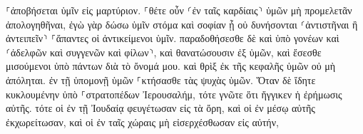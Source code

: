 \documentclass{openreader}
\begin{document}
⸀ἀποβήσεται ὑμῖν εἰς μαρτύριον. 
⸀θέτε οὖν ⸂ἐν ταῖς καρδίαις⸃ ὑμῶν μὴ προμελετᾶν ἀπολογηθῆναι, 
ἐγὼ γὰρ δώσω ὑμῖν στόμα καὶ σοφίαν ᾗ οὐ δυνήσονται ⸂ἀντιστῆναι ἢ ἀντειπεῖν⸃ ⸀ἅπαντες οἱ ἀντικείμενοι ὑμῖν. 
παραδοθήσεσθε δὲ καὶ ὑπὸ γονέων καὶ ⸂ἀδελφῶν καὶ συγγενῶν καὶ φίλων⸃, καὶ θανατώσουσιν ἐξ ὑμῶν, 
καὶ ἔσεσθε μισούμενοι ὑπὸ πάντων διὰ τὸ ὄνομά μου. 
καὶ θρὶξ ἐκ τῆς κεφαλῆς ὑμῶν οὐ μὴ ἀπόληται. 
ἐν τῇ ὑπομονῇ ὑμῶν ⸀κτήσασθε τὰς ψυχὰς ὑμῶν. 
Ὅταν δὲ ἴδητε κυκλουμένην ὑπὸ ⸀στρατοπέδων Ἰερουσαλήμ, τότε γνῶτε ὅτι ἤγγικεν ἡ ἐρήμωσις αὐτῆς. 
τότε οἱ ἐν τῇ Ἰουδαίᾳ φευγέτωσαν εἰς τὰ ὄρη, καὶ οἱ ἐν μέσῳ αὐτῆς ἐκχωρείτωσαν, καὶ οἱ ἐν ταῖς χώραις μὴ εἰσερχέσθωσαν εἰς αὐτήν, 
\end{document}
